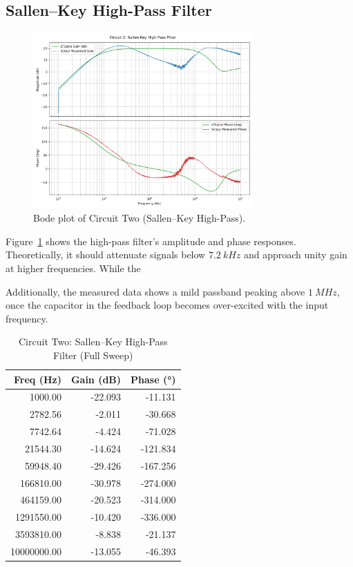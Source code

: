 \documentclass[12pt]{article}
\begin{document}
\subsection{Sallen--Key High-Pass Filter}

\begin{figure}[H]
	\centering
	\includegraphics[width=0.75\textwidth]{07_bode2}
	\caption{Bode plot of Circuit Two (Sallen--Key High-Pass).}
	\label{fig:bode2}
\end{figure}

Figure~\ref{fig:bode2} shows the high-pass filter’s amplitude and phase
responses. Theoretically, it should attenuate signals below
$\SI{7.2}{kHz}$ and approach unity gain at higher frequencies. While the

Additionally, the measured data shows a mild passband peaking above
$\SI{1}{MHz}$, once the capacitor in the feedback loop becomes over-excited
with the input frequency.

\begin{table}[H]
	\centering
	\begin{tabular}{|r|r|r|}
		\hline
		\textbf{Freq (Hz)} & \textbf{Gain (dB)} & \textbf{Phase (°)} \\
		\hline
		1000.00            & -22.093            & -11.131            \\
		2782.56            & -2.011             & -30.668            \\
		7742.64            & -4.424             & -71.028            \\
		21544.30           & -14.624            & -121.834           \\
		59948.40           & -29.426            & -167.256           \\
		166810.00          & -30.978            & -274.000           \\
		464159.00          & -20.523            & -314.000           \\
		1291550.00         & -10.420            & -336.000           \\
		3593810.00         & -8.838             & -21.137            \\
		10000000.00        & -13.055            & -46.393            \\
		\hline
	\end{tabular}
	\caption{Circuit Two: Sallen--Key High-Pass Filter (Full Sweep)}
	\label{tab:C2_HPF_full}
\end{table}
\end{document}
